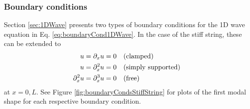 

\subsubsection{Boundary conditions}
Section \ref{sec:1DWave} presents two types of boundary conditions for the 1D wave equation in Eq. \eqref{eq:boundaryCond1DWave}. In the case of the stiff string, these can be extended to
\begin{subequations}\label{eq:stiffStringBoundConds}
    \begin{align}
        u = \partial_x u &= 0 \quad \text{(clamped)}\label{eq:BCclamped}\\
        u = \partial_x^2 u &= 0 \quad \text{(simply supported)}\label{eq:BCsimplySupported}\\
        \partial_x^2 u = \partial_x^3 u &= 0 \quad \text{(free)}\label{eq:BCfree}
    \end{align}
\end{subequations}
at $x = 0, L$. See Figure \ref{fig:boundaryCondsStiffString} for plots of the first modal shape for each respective boundary condition. 
\def\figWidth{0.32}
